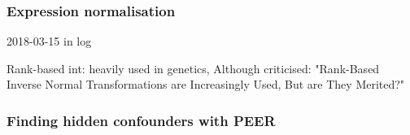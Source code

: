 \subsubsection{Expression normalisation}

2018-03-15 in log

Rank-based int:
heavily used in genetics, 
    Although criticised: "Rank-Based Inverse Normal Transformations are Increasingly Used, But are They Merited?"

\subsubsection{Finding hidden confounders with PEER}

